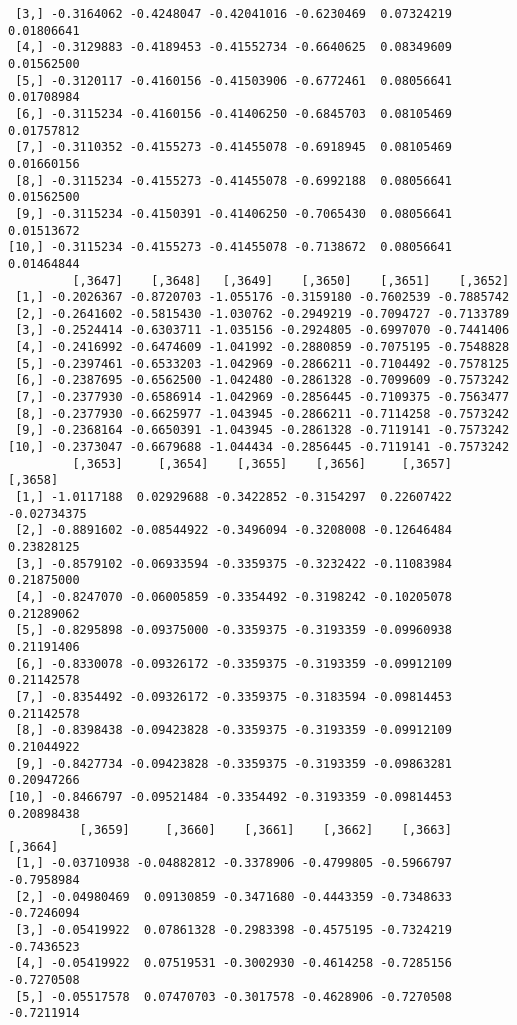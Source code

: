 \documentclass[
  letterpaper,
  DIV=11,
  numbers=noendperiod]{scrreprt}
\begin{document}
\begin{verbatim}
 [3,] -0.3164062 -0.4248047 -0.42041016 -0.6230469  0.07324219  0.01806641
 [4,] -0.3129883 -0.4189453 -0.41552734 -0.6640625  0.08349609  0.01562500
 [5,] -0.3120117 -0.4160156 -0.41503906 -0.6772461  0.08056641  0.01708984
 [6,] -0.3115234 -0.4160156 -0.41406250 -0.6845703  0.08105469  0.01757812
 [7,] -0.3110352 -0.4155273 -0.41455078 -0.6918945  0.08105469  0.01660156
 [8,] -0.3115234 -0.4155273 -0.41455078 -0.6992188  0.08056641  0.01562500
 [9,] -0.3115234 -0.4150391 -0.41406250 -0.7065430  0.08056641  0.01513672
[10,] -0.3115234 -0.4155273 -0.41455078 -0.7138672  0.08056641  0.01464844
         [,3647]    [,3648]   [,3649]    [,3650]    [,3651]    [,3652]
 [1,] -0.2026367 -0.8720703 -1.055176 -0.3159180 -0.7602539 -0.7885742
 [2,] -0.2641602 -0.5815430 -1.030762 -0.2949219 -0.7094727 -0.7133789
 [3,] -0.2524414 -0.6303711 -1.035156 -0.2924805 -0.6997070 -0.7441406
 [4,] -0.2416992 -0.6474609 -1.041992 -0.2880859 -0.7075195 -0.7548828
 [5,] -0.2397461 -0.6533203 -1.042969 -0.2866211 -0.7104492 -0.7578125
 [6,] -0.2387695 -0.6562500 -1.042480 -0.2861328 -0.7099609 -0.7573242
 [7,] -0.2377930 -0.6586914 -1.042969 -0.2856445 -0.7109375 -0.7563477
 [8,] -0.2377930 -0.6625977 -1.043945 -0.2866211 -0.7114258 -0.7573242
 [9,] -0.2368164 -0.6650391 -1.043945 -0.2861328 -0.7119141 -0.7573242
[10,] -0.2373047 -0.6679688 -1.044434 -0.2856445 -0.7119141 -0.7573242
         [,3653]     [,3654]    [,3655]    [,3656]     [,3657]     [,3658]
 [1,] -1.0117188  0.02929688 -0.3422852 -0.3154297  0.22607422 -0.02734375
 [2,] -0.8891602 -0.08544922 -0.3496094 -0.3208008 -0.12646484  0.23828125
 [3,] -0.8579102 -0.06933594 -0.3359375 -0.3232422 -0.11083984  0.21875000
 [4,] -0.8247070 -0.06005859 -0.3354492 -0.3198242 -0.10205078  0.21289062
 [5,] -0.8295898 -0.09375000 -0.3359375 -0.3193359 -0.09960938  0.21191406
 [6,] -0.8330078 -0.09326172 -0.3359375 -0.3193359 -0.09912109  0.21142578
 [7,] -0.8354492 -0.09326172 -0.3359375 -0.3183594 -0.09814453  0.21142578
 [8,] -0.8398438 -0.09423828 -0.3359375 -0.3193359 -0.09912109  0.21044922
 [9,] -0.8427734 -0.09423828 -0.3359375 -0.3193359 -0.09863281  0.20947266
[10,] -0.8466797 -0.09521484 -0.3354492 -0.3193359 -0.09814453  0.20898438
          [,3659]     [,3660]    [,3661]    [,3662]    [,3663]    [,3664]
 [1,] -0.03710938 -0.04882812 -0.3378906 -0.4799805 -0.5966797 -0.7958984
 [2,] -0.04980469  0.09130859 -0.3471680 -0.4443359 -0.7348633 -0.7246094
 [3,] -0.05419922  0.07861328 -0.2983398 -0.4575195 -0.7324219 -0.7436523
 [4,] -0.05419922  0.07519531 -0.3002930 -0.4614258 -0.7285156 -0.7270508
 [5,] -0.05517578  0.07470703 -0.3017578 -0.4628906 -0.7270508 -0.7211914

\end{verbatim}
\end{document}
